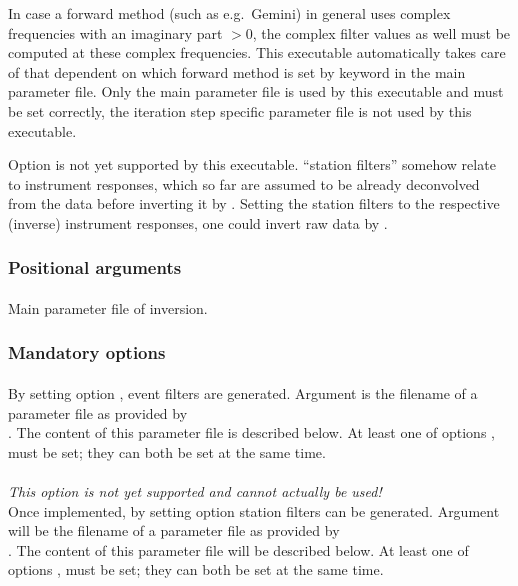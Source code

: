 In case a forward method (such as e.g.\ Gemini) in general uses complex frequencies with an imaginary part $> 0$, 
the complex filter values as well must be computed at these complex frequencies.
This executable automatically takes care of that dependent on which forward method is set by 
keyword  in the main parameter file. Only the main parameter file is used by
this executable and must be set correctly, the iteration step specific parameter file is not used by
this executable. 

Option  is not yet supported by this executable. ``station filters'' somehow relate to
instrument responses, which so far are assumed to be already deconvolved from the data
before inverting it by \ASKI{}. Setting the station filters to the respective (inverse) instrument responses,
one could invert raw data by \ASKI{}.

\subsubsection{Positional arguments}
\paragraph{}
Main parameter file of inversion.

\subsubsection{Mandatory options}
\paragraph{}
By setting option , event filters are generated. Argument
 is the filename of a parameter file as provided by \\
 . The content of this parameter file is described below.
At least one of options ,  must be set; they can both be set at the same time.

\paragraph{}
\emph{This option is not yet supported and cannot actually be used!}\\
Once implemented, by setting option  station filters can be generated. Argument
 will be the filename of a parameter file as provided by \\
 . The content of this 
parameter file will be described below.
At least one of options ,  must be set; they can both be set at the same time.


